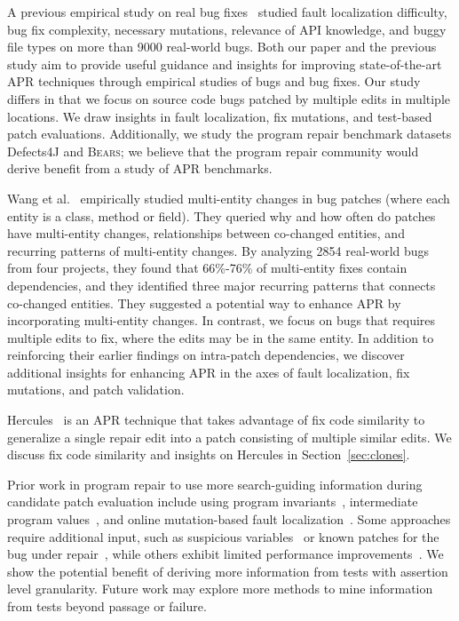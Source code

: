 \documentclass[10pt, conference]{IEEEtran}
\newcommand\bears{\textsc{Bears}\xspace}
\begin{document}
A previous empirical study on real bug fixes~\cite{zhong2015} 
studied fault localization difficulty, bug fix complexity, necessary
mutations, relevance of API knowledge, and buggy file types
on more than 9000 real-world bugs.  
Both our paper and the previous study aim to provide useful guidance and insights for 
improving state-of-the-art APR techniques through empirical studies of bugs and bug fixes. 
Our study differs in that we focus on 
source code bugs patched by multiple edits in multiple locations. 
We draw insights in fault localization, fix mutations, and test-based 
patch evaluations. Additionally, we study the program repair 
benchmark datasets Defects4J 
and \bears; we believe that the program repair community would derive 
benefit from a study of APR benchmarks.

Wang et al.~\cite{wang2018} empirically studied multi-entity changes in bug patches 
(where each entity is a class, method or field). They queried
why and how often do patches have multi-entity changes, relationships 
between co-changed entities, and recurring patterns of multi-entity changes. 
By analyzing 2854 real-world bugs from four projects, they found that 66\%-76\% of
multi-entity fixes contain dependencies, 
and they identified three major recurring patterns that connects co-changed entities. 
They suggested a potential way to 
enhance APR by incorporating multi-entity changes. In contrast, we focus on bugs that
requires multiple edits to fix, where the edits may be in the same entity. In addition 
to reinforcing their earlier findings on intra-patch dependencies, we discover 
additional insights for enhancing APR in the axes of fault localization, 
fix mutations, and patch validation.

Hercules~\cite{saha2019harnessing} is an APR technique that takes 
advantage of fix code similarity to generalize a single repair edit into a 
patch consisting of multiple similar edits.
We discuss fix code similarity and insights on Hercules in 
Section~\ref{sec:clones}.

Prior work in program repair to use more search-guiding information 
during candidate patch evaluation 
include using program invariants~\cite{better-fitness, dinglyu}, 
intermediate program values~\cite{source-code-checkpoint}, 
and online mutation-based fault localization~\cite{mut-analysis}.
Some approaches require additional input, such as suspicious variables~\cite{source-code-checkpoint} 
or known patches for the bug under repair~\cite{better-fitness}, 
while others exhibit limited performance improvements~\cite{dinglyu, mut-analysis}.
We show the potential benefit of deriving more information from tests
with assertion level granularity.
Future work may explore more methods to mine information from tests 
beyond passage or failure.
\end{document}

